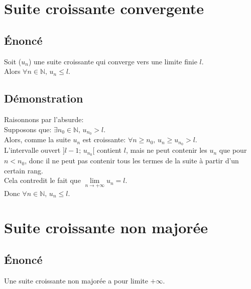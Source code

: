 \documentclass[12px]{article}
\begin{document}
	\begin{center}
	\end{center}
	
	\section{Suite croissante convergente}
	
	\subsection{\'Enoncé}
	Soit ($u_n$) une suite croissante qui converge vers une limite finie $l$.\\
	Alors $\forall n\in\mathbb{N}, \,u_n\leq l$.
	
	\subsection{Démonstration}
	Raisonnons par l'absurde:\\
	Supposons que: $\exists n_0 \in\mathbb{N}, \,u_{n_0}>l$.\\
	Alors, comme la suite $u_n$ est croissante: $\forall n\geq n_{0}, \,u_n\geq u_{n_0}>l$.\\
	L'intervalle ouvert $]l-1; \,u_{n_{0}}[$ contient $l$, mais ne peut contenir les $u_n$ que pour $n<n_0$, donc il ne peut pas contenir tous les termes de la suite à partir d'un certain rang.\\
	Cela contredit le fait que $\lim\limits_{n\rightarrow +\infty}u_n =l$.\\
	Donc $\forall n\in\mathbb{N}, \,u_n\leq l$.
	
	\section{Suite croissante non majorée}
	
	\subsection{\'Enoncé}
	Une suite croissante non majorée a pour limite $+\infty$.
	
\end{document}
